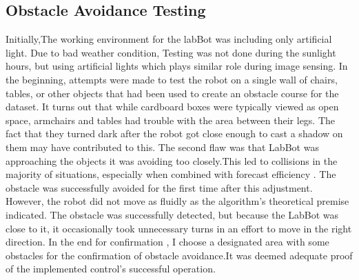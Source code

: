 \documentclass[11pt, a4paper, openany]{book}
\begin{document}
\subsection{Obstacle Avoidance Testing}
Initially,The working environment for the labBot was including only artificial light. Due to bad weather condition, Testing was not done during the sunlight hours, but using artificial lights which plays similar role during image sensing.
In the beginning, attempts were made to test the robot on a single wall of chairs, tables, or other objects that had been used to create an obstacle course for the dataset. It turns out that while cardboard boxes were typically viewed as open space, armchairs and tables had trouble with the area between their legs. The fact that they turned dark after the robot got close enough to cast a shadow on them may have contributed to this. The second flaw was that LabBot was approaching the objects it was avoiding too closely.This led to collisions in the majority of situations, especially when combined with forecast efficiency .\newline
The obstacle was successfully avoided for the first time after this adjustment. However, the robot did not move as fluidly as the algorithm's theoretical premise indicated. The obstacle was successfully detected, but because the LabBot was close to it, it occasionally took unnecessary turns in an effort to move in the right direction.\newline
In the end for confirmation , I choose a designated area with some obstacles for the confirmation of obstacle avoidance.It was deemed adequate proof of the implemented control's successful operation.
\end{document}
